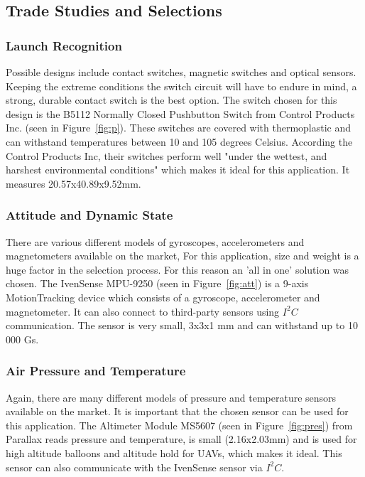 \subsection{Trade Studies and Selections}
\subsubsection{Launch Recognition}
Possible designs include contact switches, magnetic switches and optical sensors.  Keeping the extreme conditions the switch circuit will have to endure in mind, a strong, durable contact switch is the best option.  The switch chosen for this design is the B5112 Normally Closed Pushbutton Switch from Control Products Inc. (seen in Figure~\ref{fig:p}). These switches are covered with thermoplastic and can withstand temperatures between 10 and 105 degrees Celsius.  According the Control Products Inc, their switches perform well "under the wettest, and harshest environmental conditions" which makes it ideal for this application.  It measures 20.57x40.89x9.52mm.
\subsubsection{Attitude and Dynamic State}
There are various different models of gyroscopes, accelerometers and magnetometers available on the market,  For this application, size and weight is a huge factor in the selection process.  For this reason an 'all in one' solution was chosen.  The IvenSense MPU-9250 (seen in Figure~\ref{fig:att}) is a 9-axis MotionTracking device which consists of a gyroscope, accelerometer and magnetometer.  It can also connect to third-party sensors using $I^2C$ communication.  The sensor is very small, 3x3x1 mm and can withstand up to 10 000 Gs.
\subsubsection{Air Pressure and Temperature}
Again, there are many different models of pressure and temperature sensors available on the market.  It is important that the chosen sensor can be used for this application.  The Altimeter Module MS5607 (seen in Figure~\ref{fig:pres}) from Parallax reads pressure and temperature, is small (2.16x2.03mm) and is used for high altitude balloons and altitude hold for UAVs, which makes it ideal.  This sensor can also communicate with the IvenSense sensor via $I^2C$.

